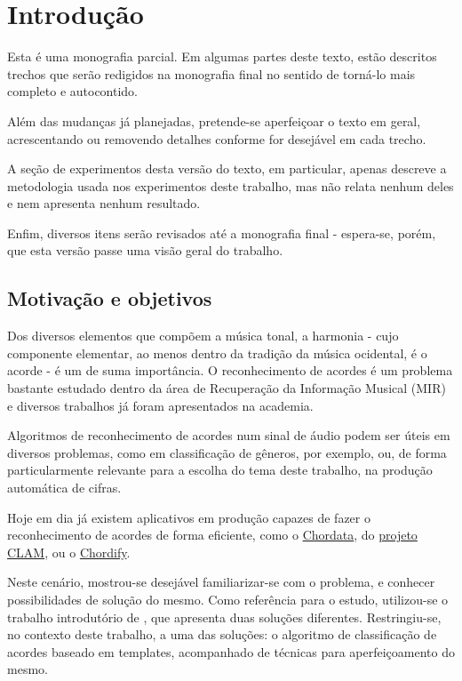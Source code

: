 \chapter{Introdução}
\label{cap:introducao}
    Esta é uma monografia parcial. Em algumas partes deste texto, estão descritos trechos que serão redigidos na monografia final no sentido de torná-lo mais completo e autocontido.
    
    Além das mudanças já planejadas, pretende-se aperfeiçoar o texto em geral, acrescentando ou removendo detalhes conforme for desejável em cada trecho.
    
    A seção de experimentos desta versão do texto, em particular, apenas descreve a metodologia usada nos experimentos deste trabalho, mas não relata nenhum deles e nem apresenta nenhum resultado.
    
    Enfim, diversos itens serão revisados até a monografia final - espera-se, porém, que esta versão passe uma visão geral do trabalho.

\section{Motivação e objetivos}
    Dos diversos elementos que compõem a música tonal, a harmonia - cujo componente elementar, ao menos dentro da tradição da música ocidental, é o acorde - é um de suma importância. O reconhecimento de acordes é um problema bastante estudado dentro da área de Recuperação da Informação Musical (MIR) e diversos trabalhos já foram apresentados na academia.
    
    Algoritmos de reconhecimento de acordes num sinal de áudio podem ser úteis em diversos problemas, como em classificação de gêneros, por exemplo, ou, de forma particularmente relevante para a escolha do tema deste trabalho, na produção automática de cifras.
    
    Hoje em dia já existem aplicativos em produção capazes de fazer o reconhecimento de acordes de forma eficiente, como o \href{http://clam-project.org/wiki/Chordata_tutorial}{Chordata}, do \href{http://clam-project.org/index.html}{projeto CLAM}, ou o \href{https://chordify.net/}{Chordify}.
    
    Neste cenário, mostrou-se desejável familiarizar-se com o problema, e conhecer possibilidades de solução do mesmo. Como referência para o estudo, utilizou-se o trabalho introdutório de \cite{muller}, que apresenta duas soluções diferentes. Restringiu-se, no contexto deste trabalho, a uma das soluções: o algoritmo de classificação de acordes baseado em templates, acompanhado de técnicas para aperfeiçoamento do mesmo.

